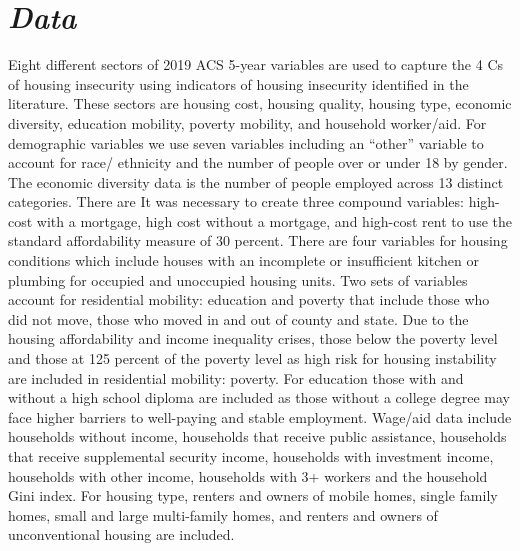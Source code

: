 \section{\textit{Data}}
Eight different sectors of 2019 ACS 5-year variables are used to capture the 4 Cs of housing insecurity using indicators of housing insecurity identified in the literature. These sectors are housing cost, housing quality, housing type, economic diversity, education mobility, poverty mobility, and household worker/aid. For demographic variables we use seven variables including an “other” variable to account for race/ ethnicity and the number of people over or under 18 by gender. The economic diversity data is the number of people employed across 13 distinct categories. There are It was necessary to create three compound variables: high-cost with a mortgage, high cost without a mortgage, and high-cost rent to use the standard affordability measure of 30 percent. There are four variables for housing conditions which include houses with an incomplete or insufficient kitchen or plumbing for occupied and unoccupied housing units. Two sets of variables account for residential mobility: education and poverty that include those who did not move, those who moved in and out of county and state.  Due to the housing affordability and income inequality crises, those below the poverty level and those at 125 percent of the poverty level as high risk for housing instability are included in residential mobility: poverty. For education those with and without a high school diploma are included as those without a college degree may face higher barriers to well-paying and stable employment. Wage/aid data include households without income, households that receive public assistance, households that receive supplemental security income, households with investment income, households with other income, households with 3+ workers and the household Gini index. For housing type, renters and owners of mobile homes, single family homes, small and large multi-family homes, and renters and owners of unconventional housing are included.  

